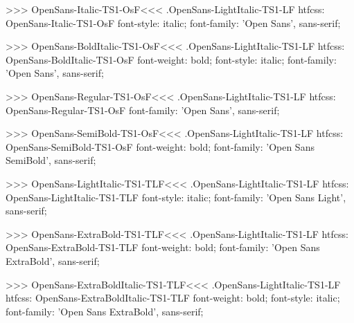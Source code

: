 >>>
\<OpenSans-Italic-TS1-OsF\><<<
.OpenSans-LightItalic-TS1-LF
htfcss:  OpenSans-Italic-TS1-OsF  font-style: italic; font-family: 'Open Sans', sans-serif;

>>>
\<OpenSans-BoldItalic-TS1-OsF\><<<
.OpenSans-LightItalic-TS1-LF
htfcss:  OpenSans-BoldItalic-TS1-OsF  font-weight: bold; font-style: italic; font-family: 'Open Sans', sans-serif;

>>>
\<OpenSans-Regular-TS1-OsF\><<<
.OpenSans-LightItalic-TS1-LF
htfcss:  OpenSans-Regular-TS1-OsF  font-family: 'Open Sans', sans-serif;

>>>
\<OpenSans-SemiBold-TS1-OsF\><<<
.OpenSans-LightItalic-TS1-LF
htfcss:  OpenSans-SemiBold-TS1-OsF  font-weight: bold; font-family: 'Open Sans SemiBold', sans-serif;

>>>
\<OpenSans-LightItalic-TS1-TLF\><<<
.OpenSans-LightItalic-TS1-LF
htfcss:  OpenSans-LightItalic-TS1-TLF  font-style: italic; font-family: 'Open Sans Light', sans-serif;

>>>
\<OpenSans-ExtraBold-TS1-TLF\><<<
.OpenSans-LightItalic-TS1-LF
htfcss:  OpenSans-ExtraBold-TS1-TLF  font-weight: bold; font-family: 'Open Sans ExtraBold', sans-serif;

>>>
\<OpenSans-ExtraBoldItalic-TS1-TLF\><<<
.OpenSans-LightItalic-TS1-LF
htfcss:  OpenSans-ExtraBoldItalic-TS1-TLF  font-weight: bold; font-style: italic; font-family: 'Open Sans ExtraBold', sans-serif;

